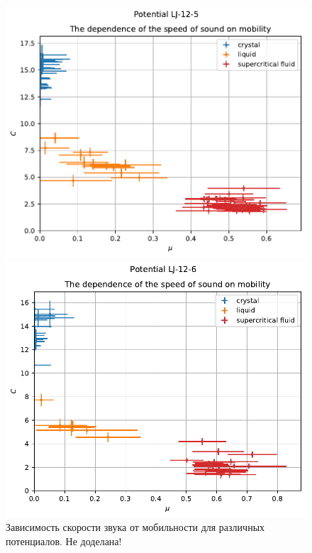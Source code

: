 \documentclass[pdf,hyperref={unicode}]{beamer}
\begin{document}
\begin{frame}
\begin{figure}[h]
\begin{center}
\begin{minipage}[h]{0.35\linewidth}
\includegraphics[width=\textwidth, keepaspectratio]{sound_speed_mobility_Potential LJ-12-5_1}
\end{minipage}
\begin{minipage}[h]{0.35\linewidth}
\includegraphics[width=\textwidth, keepaspectratio]{sound_speed_mobility_Potential LJ-12-6_1}
\end{minipage}
\caption{\tiny Зависимость скорости звука от мобильности для различных потенциалов. Не доделана!}
\label{risCMu}
\end{center}
\end{figure}

\end{frame}
\end{document}
